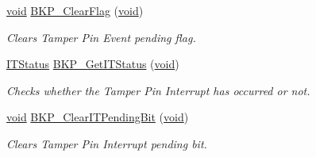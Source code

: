 \begin{DoxyCompactItemize}
\hyperlink{usb__devapi_8h_afabf60e7f57651d6d595a02c75f07cd0}{void} \hyperlink{group___b_k_p___private___functions_ga3f3aea5b0a3d8d5d79b0b506928351ea}{B\+K\+P\+\_\+\+Clear\+Flag} (\hyperlink{usb__devapi_8h_afabf60e7f57651d6d595a02c75f07cd0}{void})
\begin{DoxyCompactList}\small\item\em Clears Tamper Pin Event pending flag. \end{DoxyCompactList}\item 
\hyperlink{agilefox_2library_2inc_2stm32f10x__type_8h_aacbd7ed539db0aacd973a0f6eca34074}{I\+T\+Status} \hyperlink{group___b_k_p___private___functions_ga99566c9f1f17f499020606cb63511494}{B\+K\+P\+\_\+\+Get\+I\+T\+Status} (\hyperlink{usb__devapi_8h_afabf60e7f57651d6d595a02c75f07cd0}{void})
\begin{DoxyCompactList}\small\item\em Checks whether the Tamper Pin Interrupt has occurred or not. \end{DoxyCompactList}\item 
\hyperlink{usb__devapi_8h_afabf60e7f57651d6d595a02c75f07cd0}{void} \hyperlink{group___b_k_p___private___functions_ga6a93ef8e40959bb10fea670e2040ad74}{B\+K\+P\+\_\+\+Clear\+I\+T\+Pending\+Bit} (\hyperlink{usb__devapi_8h_afabf60e7f57651d6d595a02c75f07cd0}{void})
\begin{DoxyCompactList}\small\item\em Clears Tamper Pin Interrupt pending bit. \end{DoxyCompactList}\end{DoxyCompactItemize}
